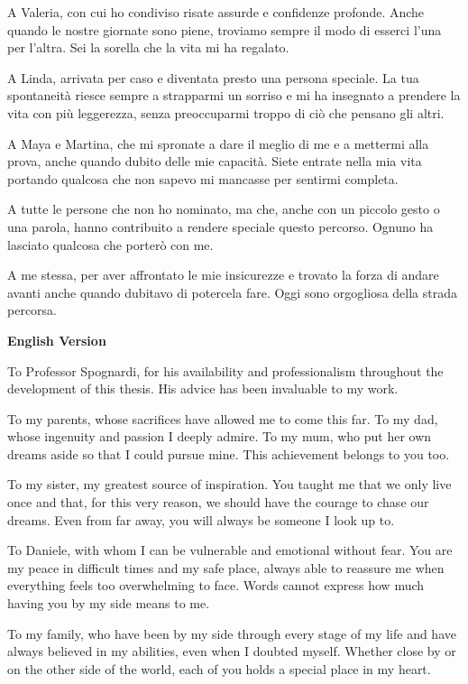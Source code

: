 A Valeria,
con cui ho condiviso risate assurde e confidenze profonde.
Anche quando le nostre giornate sono piene, troviamo sempre
il modo di esserci l'una per l'altra.
Sei la sorella che la vita mi ha regalato.

A Linda,
arrivata per caso e diventata presto una persona speciale. La tua
spontaneità riesce sempre a strapparmi un sorriso e mi ha insegnato
a prendere la vita con più leggerezza, senza preoccuparmi troppo di
ciò che pensano gli altri.

A Maya e Martina,
che mi spronate a dare il meglio di me e a mettermi alla prova,
anche quando dubito delle mie capacità.
Siete entrate nella mia vita portando qualcosa che
non sapevo mi mancasse per sentirmi completa.

A tutte le persone che non ho nominato,
ma che, anche con un piccolo gesto o una parola,
hanno contribuito a rendere speciale questo percorso.
Ognuno ha lasciato qualcosa che porterò con me.

A me stessa,
per aver affrontato le mie insicurezze e trovato la forza
di andare avanti anche quando dubitavo di potercela fare.
Oggi sono orgogliosa della strada percorsa.

\endgroup


\newpage
\small\textbf{English Version}

\begingroup
\setlength{\parskip}{0.5em}
To Professor Spognardi,
for his availability and professionalism throughout the
development of this thesis. His advice has been
invaluable to my work.

To my parents,
whose sacrifices have allowed me to come this far.
To my dad, whose ingenuity and passion I deeply admire.
To my mum, who put her own dreams aside so that I could
pursue mine. This achievement belongs to you too.

To my sister,
my greatest source of inspiration. You taught me that
we only live once and that, for this very reason,
we should have the courage to chase our dreams.
Even from far away, you will always be someone I look up to.

To Daniele,
with whom I can be vulnerable and emotional without fear.
You are my peace in difficult times and my safe place,
always able to reassure me when everything feels too
overwhelming to face. Words cannot express how much
having you by my side means to me.

To my family,
who have been by my side through every stage of my life
and have always believed in my abilities, even when
I doubted myself. Whether close by or on the other
side of the world, each of you holds a special place
in my heart.

